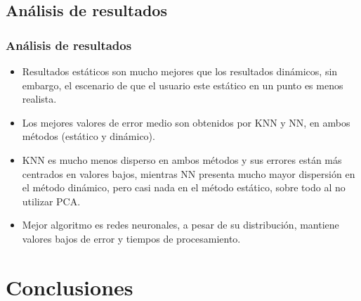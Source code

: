 \documentclass[mathserif]{beamer}
\begin{document}
\subsection{Análisis de resultados}
\begin{frame}
\frametitle{Análisis de resultados}

\begin{itemize}

\item Resultados estáticos son mucho mejores que los resultados dinámicos, sin embargo, el escenario de que el usuario este estático en un punto es menos realista.
\pause

\item Los mejores valores de error medio son obtenidos por KNN y NN, en ambos métodos (estático y dinámico).
\pause

\item KNN es mucho menos disperso en ambos métodos y sus errores están más centrados en valores bajos, mientras NN presenta mucho mayor dispersión en el método dinámico, pero casi nada en el método estático, sobre todo al no utilizar PCA.
\pause

\item Mejor algoritmo es redes neuronales, a pesar de su distribución, mantiene valores bajos de error y tiempos de procesamiento.

\end{itemize}



\end{frame}

\section{Conclusiones}
\end{document}
